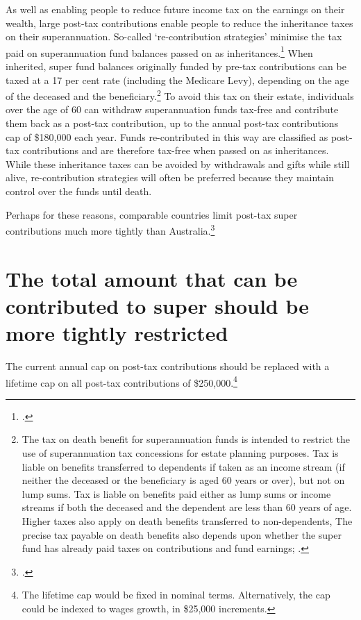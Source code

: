 As well as enabling people to reduce future income tax on the earnings on their wealth, large post-tax contributions enable people to reduce the inheritance taxes on their superannuation. So-called ‘re-contribution strategies’ minimise the tax paid on superannuation fund balances passed on as inheritances.\footcite[][26]{RiceWarner2015SubmissionFSI}  When inherited, super fund balances originally funded by pre-tax contributions can be taxed at a 17 per cent rate (including the Medicare Levy), depending on the age of the deceased and the beneficiary.\footnote{The tax on death benefit for superannuation funds is intended to restrict the use of superannuation tax concessions for estate planning purposes. Tax is liable on benefits transferred to dependents if taken as an income stream (if neither the deceased or the beneficiary is aged 60 years or over), but not on lump sums. Tax is liable on benefits paid either as lump sums or income streams if both the deceased and the dependent are less than 60 years of age. Higher taxes also apply on death benefits transferred to non-dependents, The precise tax payable on death benefits also depends upon whether the super fund has already paid taxes on contributions and fund earnings; \textcite{ATO2015DeathBenefits}.}  To avoid this tax on their estate, individuals over the age of 60 can withdraw superannuation funds tax-free and contribute them back as a post-tax contribution, up to the annual post-tax contributions cap of \$180,000 each year. Funds re-contributed in this way are classified as post-tax contributions and are therefore tax-free when passed on as inheritances. While these inheritance taxes can be avoided by withdrawals and gifts while still alive, re-contribution strategies will often be preferred because they maintain control over the funds until death.

Perhaps for these reasons, comparable countries limit post-tax super contributions much more tightly than Australia.\footcite[][8]{IndustrySuperAustralia2015-Nearly-half-Australians-not-have-comfortable-retirement}  

\section{The total amount that can be contributed to super should be more tightly restricted}\label{sec:SUPER-5-2}
The current annual cap on post-tax contributions should be replaced with a lifetime cap on all post-tax contributions of \$250,000.\footnote{The lifetime cap would be fixed in nominal terms. Alternatively, the cap could be indexed to wages growth, in \$25,000 increments.}  

